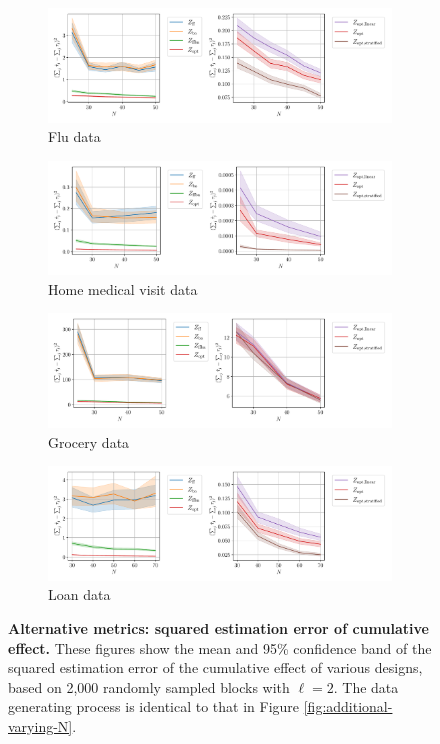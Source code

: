 \clearpage

\begin{figure}[H]
	\centering
	\begin{subfigure}{1\textwidth}
		\centering
		\includegraphics[width=0.65\linewidth]{plots/empirical/flu/nonadaptive/flu_T_7_varying_N_lag_2_total-effect.pdf}
		\caption{Flu data}
	\end{subfigure}
	\begin{subfigure}{1\textwidth}
		\centering
		\includegraphics[width=0.65\linewidth]{plots/empirical/medical/medical_T_10_varying_N_lag_2_total-effect.pdf}
		\caption{Home medical visit data}
	\end{subfigure}
	\begin{subfigure}{1\textwidth}
		\centering
		\includegraphics[width=0.65\linewidth]{plots/empirical/grocery/grocery_T_20_varying_N_lag_2_total-effect.pdf}
		\caption{Grocery data}
	\end{subfigure}
	\begin{subfigure}{1\textwidth}
		\centering
		\includegraphics[width=0.65\linewidth]{plots/empirical/loan/loan_T_20_varying_N_lag_2_total-effect.pdf}
		\caption{Loan data}
	\end{subfigure}
	\vspace{0.05in}
	\caption{\textbf{Alternative metrics: squared estimation error of cumulative effect.} These figures show the mean and 95\% confidence band of the squared estimation error of the cumulative effect of various designs, based on 2,000 randomly sampled blocks with $\ell = 2$. The data generating process is identical to that in Figure \ref{fig:additional-varying-N}.}
	\label{fig:varying-N-other-metrics}
\end{figure}
\clearpage

